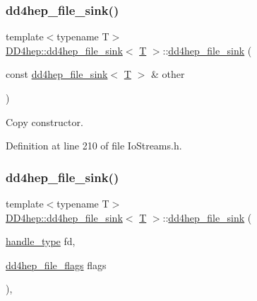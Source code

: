 \subsubsection{\texorpdfstring{dd4hep\+\_\+file\+\_\+sink()}{dd4hep\_file\_sink()}\hspace{0.1cm}{\footnotesize\ttfamily [2/6]}}
{\footnotesize\ttfamily template$<$typename T$>$ \\
\hyperlink{class_d_d4hep_1_1dd4hep__file__sink}{D\+D4hep\+::dd4hep\+\_\+file\+\_\+sink}$<$ \hyperlink{class_t}{T} $>$\+::\hyperlink{class_d_d4hep_1_1dd4hep__file__sink}{dd4hep\+\_\+file\+\_\+sink} (\begin{DoxyParamCaption}\item[{const \hyperlink{class_d_d4hep_1_1dd4hep__file__sink}{dd4hep\+\_\+file\+\_\+sink}$<$ \hyperlink{class_t}{T} $>$ \&}]{other }\end{DoxyParamCaption})\hspace{0.3cm}{\ttfamily [inline]}}



Copy constructor. 



Definition at line 210 of file Io\+Streams.\+h.

\hypertarget{class_d_d4hep_1_1dd4hep__file__sink_a6dd2a25c79f1bf4d26b8c4475d58b795}{}\label{class_d_d4hep_1_1dd4hep__file__sink_a6dd2a25c79f1bf4d26b8c4475d58b795} 
\subsubsection{\texorpdfstring{dd4hep\+\_\+file\+\_\+sink()}{dd4hep\_file\_sink()}\hspace{0.1cm}{\footnotesize\ttfamily [3/6]}}
{\footnotesize\ttfamily template$<$typename T$>$ \\
\hyperlink{class_d_d4hep_1_1dd4hep__file__sink}{D\+D4hep\+::dd4hep\+\_\+file\+\_\+sink}$<$ \hyperlink{class_t}{T} $>$\+::\hyperlink{class_d_d4hep_1_1dd4hep__file__sink}{dd4hep\+\_\+file\+\_\+sink} (\begin{DoxyParamCaption}\item[{\hyperlink{class_d_d4hep_1_1dd4hep__file_a4d79f8d433cd7831ff818691424cd6fc}{handle\+\_\+type}}]{fd,  }\item[{\hyperlink{namespace_d_d4hep_a31d19f9b0ce567067d2897fbda1761e5}{dd4hep\+\_\+file\+\_\+flags}}]{flags }\end{DoxyParamCaption})\hspace{0.3cm}{\ttfamily [inline]}, {\ttfamily [explicit]}}



